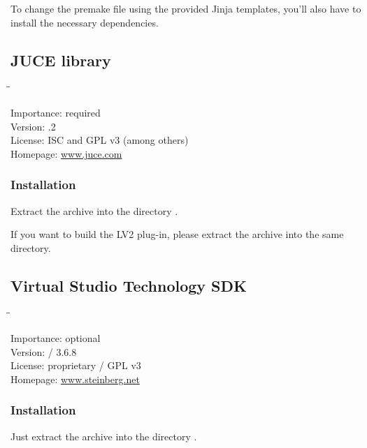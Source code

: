 To change the premake file using the provided Jinja templates, you'll
also have to install the necessary dependencies.

\newpage %

\subsection{JUCE library}

\begin{tabbing}
  \hspace*{6em}\=\=\kill

  Importance:  \> required \\
  Version:     .2 \\
  License:     \> ISC and GPL v3 (among others) \\
  Homepage:    \> \href{http://www.juce.com/}{www.juce.com}
\end{tabbing}

\subsubsection{Installation}

Extract the archive into the directory .

If you want to build the LV2 plug-in, please extract the archive
 into the same directory.

\subsection{Virtual Studio Technology SDK}

\begin{tabbing}
  \hspace*{6em}\=\=\kill

  Importance:  \> optional \\
  Version:      / 3.6.8 \\
  License:     \> proprietary / GPL v3 \\
  Homepage:    \> \href{http://www.steinberg.net/en/company/developer.html}{www.steinberg.net}
\end{tabbing}

\subsubsection{Installation}

Just extract the archive into the directory
.

